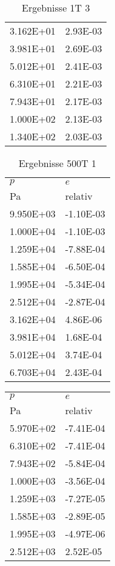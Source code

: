 \begin{table}
\begin{tabular}{l l }
\num{3.162E+01}&\num{2.93E-03}\\
\num{3.981E+01}&\num{2.69E-03}\\
\num{5.012E+01}&\num{2.41E-03}\\
\num{6.310E+01}&\num{2.21E-03}\\
\num{7.943E+01}&\num{2.17E-03}\\
\num{1.000E+02}&\num{2.13E-03}\\
\num{1.340E+02}&\num{2.03E-03}\\
\bottomrule
\end{tabular}\caption{Ergebnisse 1T 3}\end{table}\begin{table}\begin{tabular}{l l }
\toprule
$p$&$e$\\
 Pa & relativ \\\midrule
\num{9.950E+03}&\num{-1.10E-03}\\
\num{1.000E+04}&\num{-1.10E-03}\\
\num{1.259E+04}&\num{-7.88E-04}\\
\num{1.585E+04}&\num{-6.50E-04}\\
\num{1.995E+04}&\num{-5.34E-04}\\
\num{2.512E+04}&\num{-2.87E-04}\\
\num{3.162E+04}&\num{4.86E-06}\\
\num{3.981E+04}&\num{1.68E-04}\\
\num{5.012E+04}&\num{3.74E-04}\\
\num{6.703E+04}&\num{2.43E-04}\\
\bottomrule
\end{tabular}\caption{Ergebnisse 500T 1}\end{table}\begin{table}\begin{tabular}{l l }
\toprule
$p$&$e$\\
 Pa & relativ \\\midrule
\num{5.970E+02}&\num{-7.41E-04}\\
\num{6.310E+02}&\num{-7.41E-04}\\
\num{7.943E+02}&\num{-5.84E-04}\\
\num{1.000E+03}&\num{-3.56E-04}\\
\num{1.259E+03}&\num{-7.27E-05}\\
\num{1.585E+03}&\num{-2.89E-05}\\
\num{1.995E+03}&\num{-4.97E-06}\\
\num{2.512E+03}&\num{2.52E-05}\\

\end{tabular}
\end{table}
